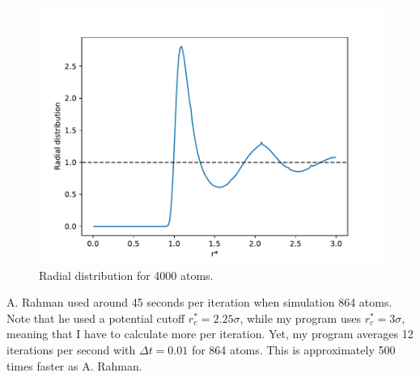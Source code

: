 \documentclass[a4paper,10pt,english]{article}
\begin{document}
\begin{figure}[h!]
    \centering
    \includegraphics[scale=0.65]{../figures/long_sim_rdf.pdf}
    \caption{Radial distribution for 4000 atoms.}
    \label{fig:rdf}
\end{figure}

A. Rahman used around 45 seconds per iteration when simulation 864 atoms. Note that he used a potential cutoff $r_c^* = 2.25 \sigma$, while my program uses $r_c^*=3 \sigma$, meaning that I have to calculate more per iteration. Yet, my program averages 12 iterations per second with $\Delta t = 0.01$ for 864 atoms. This is approximately 500 times faster as A. Rahman. 
\end{document}
